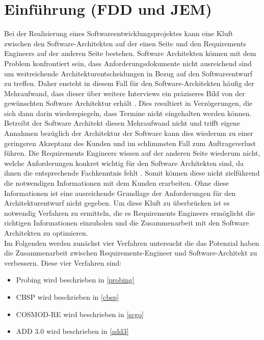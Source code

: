 \section{Einf\"uhrung (FDD und JEM)}
Bei der Realisierung eines Softwareentwicklungsprojektes kann eine Kluft zwischen den Software-Architekten auf der einen Seite und den Requirements Engineers auf der anderen Seite bestehen. Software Architekten können mit dem Problem konfrontiert sein, dass Anforderungsdokumente nicht ausreichend sind um weitreichende Architekturentscheidungen in Bezug auf den Softwareentwurf zu treffen. Daher ensteht in diesem Fall für den Software-Architekten häufig der Mehraufwand, dass dieser über weitere Interviews ein präziseres Bild von der gewünschten Software Architektur erhält \cite{Ros01}. Dies resultiert in Verzögerungen, die sich dann darin wiederspiegeln, dass Termine nicht eingehalten werden können. Betreibt der Software Architekt diesen Mehraufwand nicht und trifft eigene Annahmen bezüglich der Architektur der Software \cite{Ros01} kann dies wiederum zu einer geringeren Akzeptanz des Kunden und im schlimmsten Fall zum Auftragsverlust führen. Die Requirements Engineers wissen auf der anderen Seite wiederum nicht, welche Anforderungen konkret wichtig für den Software Architekten sind, da ihnen die entsprechende Fachkenntnis fehlt \cite{Ros01}. Somit können diese nicht zielführend die notwendigen Informationen mit dem Kunden erarbeiten. Ohne diese Informationen ist eine ausreichende Grundlage der Anforderungen für den Architekturentwurf nicht gegeben. Um diese Kluft zu überbrücken ist es notwendig Verfahren zu ermitteln, die es Requirements Engineers ermöglicht die richtigen Informationen einzuholen und die Zusammenarbeit mit den Software Architekten zu optimieren.\\

Im Folgenden werden zunächst vier Verfahren untersucht die das Potenzial haben die Zusammenarbeit zwischen Requirements-Engineer und Software-Architekt zu verbessern. Diese vier Verfahren sind:\\

\begin{itemize}
\item Probing wird beschrieben in \ref{probing}
\item CBSP wird beschrieben in \ref{cbsp}
\item COSMOD-RE wird beschrieben in \ref{scgo}
\item ADD 3.0 wird beschrieben in \ref{add3}\\
\end{itemize}

